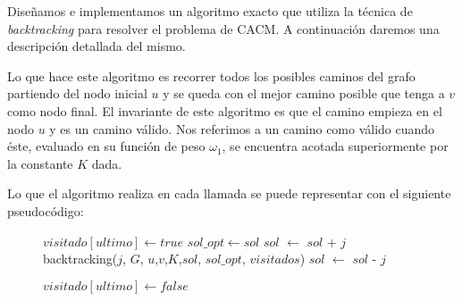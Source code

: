 Diseñamos e implementamos un algoritmo exacto que utiliza la técnica de \emph{backtracking} para resolver el problema de CACM. A continuación daremos una descripción detallada del mismo.

Lo que hace este algoritmo es recorrer todos los posibles caminos del grafo partiendo del nodo inicial $u$ y se queda con el mejor camino posible que tenga a $v$ como nodo final. El invariante de este algoritmo es que el camino empieza en el nodo $u$ y es un camino válido. Nos referimos a un camino como válido cuando éste, evaluado en su función de peso $\omega_1$, se encuentra acotada superiormente por la constante $K$ dada.

Lo que el algoritmo realiza en cada llamada se puede representar con el siguiente pseudocódigo:

\begin{center}
 \begin{figure}[H]
  \begin{pseudo}
    \State $visitado[ultimo] \leftarrow true$
	  \State $sol\_opt \leftarrow sol$
	\EndIf
      \Else 
	  \State $sol$ $\leftarrow$ $sol$ + $j$
	  \State backtracking($j$, $G$, $u$,$v$,$K$,$sol$, $sol\_opt$, $visitados$)
	  \State $sol$ $\leftarrow$ $sol$ - $j$
	\EndIf 
	
	\EndFor
      \EndIf
      \State $visitado[ultimo] \leftarrow false$
   \EndProcedure
  \end{pseudo}
 \end{figure}
\end{center}